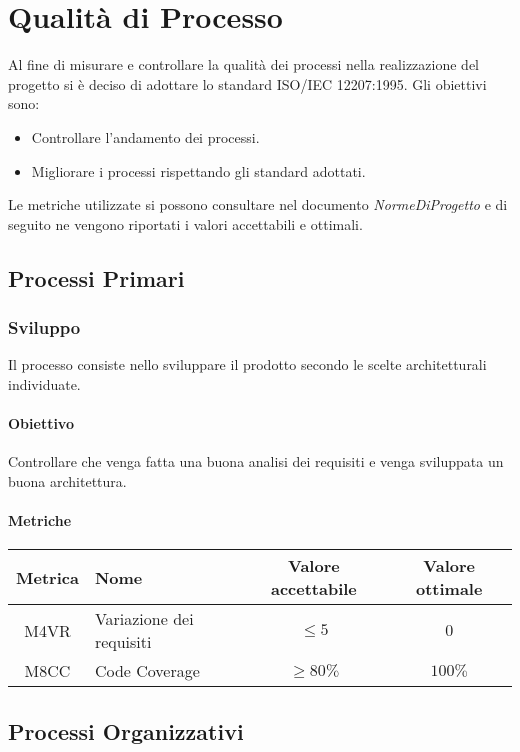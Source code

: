 \section{Qualità di Processo}
Al fine di misurare e controllare la qualità dei processi nella realizzazione del progetto si è deciso di 
adottare lo standard ISO/IEC 12207:1995.
Gli obiettivi sono:
\begin{itemize}
    \item Controllare l'andamento dei processi.
    \item Migliorare i processi rispettando gli standard adottati.
\end{itemize}
Le metriche utilizzate si possono consultare nel documento \emph{NormeDiProgetto} e di
seguito ne vengono riportati i valori accettabili e ottimali.

\subsection{Processi Primari}
\subsubsection{Sviluppo}
Il processo consiste nello sviluppare il prodotto secondo le scelte architetturali individuate.
\paragraph{Obiettivo} \hfill \break
Controllare che venga fatta una buona analisi dei requisiti e venga sviluppata un buona architettura.

\paragraph{Metriche}
\begin{center}
    \renewcommand{\arraystretch}{1.8}
    \begin{tabular}{ |c|m{12em}|c|c|}
        \hline
        \textbf{Metrica} & \textbf{Nome} & \textbf{Valore accettabile} & \textbf{Valore ottimale} \\
        \hline
        M4VR & Variazione dei requisiti & $ \leq 5 $ & $ 0 $ \\
        \hline
        M8CC & Code Coverage & $ \geq 80\% $ & $ 100\% $ \\
        \hline
    \end{tabular}
\end{center}

\subsection{Processi Organizzativi}
